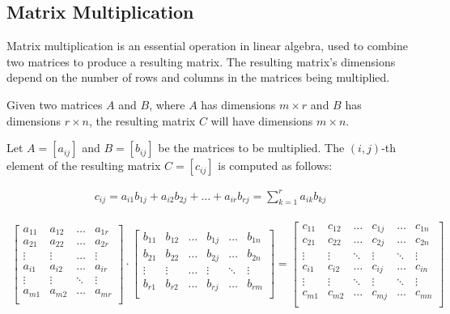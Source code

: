 \documentclass[11pt]{article}
\begin{document}
\subsection{Matrix Multiplication}

Matrix multiplication is an essential operation in linear algebra, used to combine two matrices to produce a resulting matrix. The resulting matrix's dimensions depend on the number of rows and columns in the matrices being multiplied.

Given two matrices $A$ and $B$, where $A$ has dimensions $m \times r$ and $B$ has dimensions $r \times n$, the resulting matrix $C$ will have dimensions $m \times n$.

Let $A = [a_{ij}]$ and $B = [b_{ij}]$ be the matrices to be multiplied. The $(i, j)$-th element of the resulting matrix $C = [c_{ij}]$ is computed as follows:

\begin{align*}
    c_{ij} = a_{i1}b_{1j} + a_{i2}b_{2j} + \ldots + a_{ir}b_{rj} = \sum_{k=1}^{r} a_{ik}b_{kj}   
\end{align*}

\begin{align*}
    \begin{bmatrix}
        a_{11} & a_{12} & \dots & a_{1r} \\
        a_{21} & a_{22} & \dots & a_{2r} \\
        \vdots & \vdots & \dots & \vdots \\
        a_{i1} & a_{i2} & \dots & a_{ir} \\
        \vdots & \vdots & \ddots& \vdots \\
        a_{m1} & a_{m2} & \dots & a_{mr} \\
    \end{bmatrix}
    \cdot
    \begin{bmatrix}
        b_{11} & b_{12} & \dots & b_{1j} & \dots & b_{1n} \\
        b_{21} & b_{22} & \dots & b_{2j} & \dots & b_{2n} \\
        \vdots & \vdots & \dots & \vdots & \ddots& \vdots \\
        b_{r1} & b_{r2} & \dots & b_{rj} & \dots & b_{rm} \\
    \end{bmatrix}
    =
    \begin{bmatrix}
        c_{11} & c_{12} & \dots & c_{1j} & \dots & c_{1n} \\
        c_{21} & c_{22} & \dots & c_{2j} & \dots & c_{2n} \\
        \vdots & \vdots & \ddots& \vdots & \ddots& \vdots \\
        c_{i1} & c_{i2} & \dots & c_{ij} & \dots & c_{in} \\
        \vdots & \vdots & \ddots& \vdots & \ddots& \vdots \\
        c_{m1} & c_{m2} & \dots & c_{mj} & \dots & c_{mn} \\
    \end{bmatrix}
\end{align*}
\end{document}
